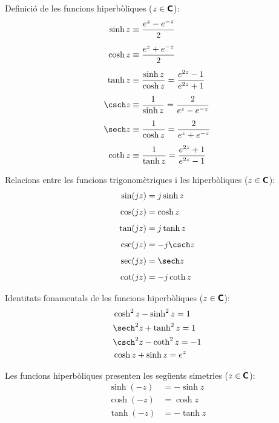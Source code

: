 Definició de les funcions hiperbòliques ($z\in{\ensuremath{\boldsymbol{\mathsf{C}}}}$):
\begin{subequations}
\begin{align}
    \sinh z&\equiv \frac{e^z - e^{-z}}{2} \\[1ex]
    \cosh z&\equiv \frac{e^z + e^{-z}}{2} \\[1ex]
    \tanh z&\equiv \frac{\sinh z}{\cosh z} = \frac{e^{2z}-1}{e^{2z}+1} \\[1ex]
    \csch z &\equiv\frac{1}{\sinh z} =
    \frac{2}{e^z - e^{-z}} \\[1ex]
    \sech z &\equiv\frac{1}{\cosh z} =
    \frac{2}{e^z + e^{-z}} \\[1ex]
    \coth z &\equiv\frac{1}{\tanh z} = \frac{e^{2z}+1}{e^{2z}-1}
\end{align}
\end{subequations}

Relacions entre les funcions trigonomètriques i les  hiperbòliques ($z\in{\ensuremath{\boldsymbol{\mathsf{C}}}}$):
\begin{subequations}
	\begin{align}
		\sin (j z) &= j \sinh z \\[1ex] 
		\cos (j z) &= \cosh z \\[1ex] 
		\tan (j z) &= j \tanh z \\[1ex] 
		\csc (j z) &= -j \csch z \\[1ex]
		\sec (j z) &=  \sech z \\[1ex]
		\cot (j z) &= -j \coth z
	\end{align}
\end{subequations}

Identitats fonamentals de les funcions hiperbòliques
($z\in{\ensuremath{\boldsymbol{\mathsf{C}}}}$):
\begin{align}
    &\cosh^2 z - \sinh^2 z = 1 \\
    &\sech^2 z + \tanh^2 z = 1 \\
    &\csch^2 z - \coth^2 z = -1 \\
    &\cosh z + \sinh z = e^z
\end{align}

Les funcions hiperbòliques presenten les següents simetries
($z\in{\ensuremath{\boldsymbol{\mathsf{C}}}}$):
\begin{subequations}
\begin{align}
    \sinh (-z) &= -\sinh z \\
    \cosh (-z) &= \cosh z\\
    \tanh (-z) &= -\tanh z
\end{align}
\end{subequations}

